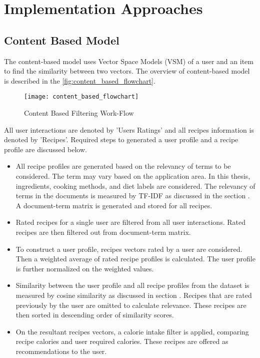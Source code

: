 \section{Implementation Approaches}
\label{sec:impl_approaches}
\subsection{Content Based Model}
\label{sec:cb}

The content-based model uses Vector Space Models (VSM) of a user and an item to find the similarity between two vectors. The overview of content-based model is described in the \autoref{fig:content_based_flowchart}. 
\begin{singlespace}
\begin{figure}[H]
	\centering
	\texttt{[image: content\_based\_flowchart]}
	\caption{Content Based Filtering Work-Flow }
	\label{fig:content_based_flowchart}
\end{figure}  
\end{singlespace}

\noindent
All user interactions are denoted by 'Users Ratings' and all recipes information is denoted by 'Recipes'. Required steps to generated a user profile and a recipe profile are discussed below.
\begin{itemize}
\item All recipe profiles are generated based on the relevancy of terms to be considered. The term may vary based on the application area. In this thesis, ingredients, cooking methods, and diet labels are considered. The relevancy of terms in the documents is measured by TF-IDF as discussed in the section . A document-term matrix is generated and stored for all recipes. 
\item Rated recipes for a single user are filtered from all user interactions. Rated recipes are then filtered out from document-term matrix. 
\item To construct a user profile, recipes vectors rated by a user are considered. Then a weighted average of rated recipe profiles is calculated. The user profile is further normalized on the weighted values. 
\item Similarity between the user profile and all recipe profiles from the dataset is measured by cosine similarity as discussed in section . Recipes that are rated previously by the user are omitted to calculate relevance. These recipes are then sorted in descending order of similarity scores.
\item On the resultant recipes vectors, a calorie intake filter is applied, comparing recipe calories and user required calories. These recipes are offered as recommendations to the user.  
\end{itemize}
 
